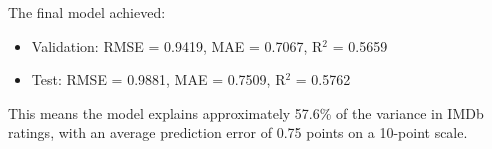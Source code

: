 The final model achieved:
\begin{itemize}
    \item Validation: RMSE = 0.9419, MAE = 0.7067, R$^2$ = 0.5659
    \item Test: RMSE = 0.9881, MAE = 0.7509, R$^2$ = 0.5762
\end{itemize}

This means the model explains approximately 57.6\% of the variance in IMDb ratings, with an average prediction error of 0.75 points on a 10-point scale.
